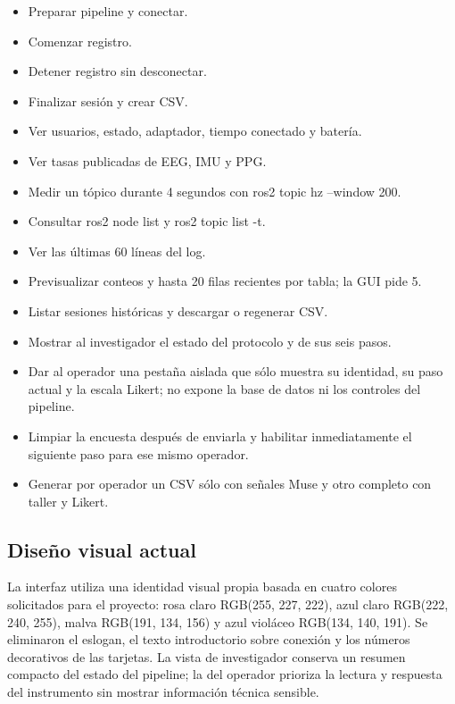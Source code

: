 \documentclass[11pt,a4paper]{article}
\begin{document}
\begin{itemize}
\item Preparar pipeline y conectar.
\item Comenzar registro.
\item Detener registro sin desconectar.
\item Finalizar sesión y crear CSV.
\item Ver usuarios, estado, adaptador, tiempo conectado y batería.
\item Ver tasas publicadas de EEG, IMU y PPG.
\item Medir un tópico durante 4 segundos con {\ttfamily\small ros2 topic hz --window 200}.
\item Consultar {\ttfamily\small ros2 node list} y {\ttfamily\small ros2 topic list -t}.
\item Ver las últimas 60 líneas del log.
\item Previsualizar conteos y hasta 20 filas recientes por tabla; la GUI pide 5.
\item Listar sesiones históricas y descargar o regenerar CSV.
\item Mostrar al investigador el estado del protocolo y de sus seis pasos.
\item Dar al operador una pestaña aislada que sólo muestra su identidad, su paso actual y
la escala Likert; no expone la base de datos ni los controles del pipeline.
\item Limpiar la encuesta después de enviarla y habilitar inmediatamente el siguiente paso
para ese mismo operador.
\item Generar por operador un CSV sólo con señales Muse y otro completo con taller y Likert.
\end{itemize}

\subsection{Diseño visual actual}

La interfaz utiliza una identidad visual propia basada en cuatro colores solicitados para
el proyecto: rosa claro RGB(255, 227, 222), azul claro RGB(222, 240, 255), malva
RGB(191, 134, 156) y azul violáceo RGB(134, 140, 191). Se eliminaron el eslogan, el texto
introductorio sobre conexión y los números decorativos de las tarjetas. La vista de
investigador conserva un resumen compacto del estado del pipeline; la del operador prioriza
la lectura y respuesta del instrumento sin mostrar información técnica sensible.
\end{document}
